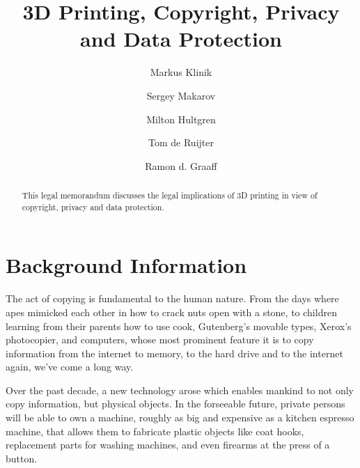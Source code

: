 \documentclass[a4paper]{article}
\begin{document}
\title{3D Printing, Copyright, Privacy and Data Protection}
\author{Markus Klinik
   \and Sergey Makarov
   \and Milton Hultgren
   \and Tom de Ruijter
   \and Ramon d. Graaff}
\maketitle

\begin{abstract}

This legal memorandum discusses the legal implications of 3D printing in view of
copyright, privacy and data protection.

\end{abstract}

\section{Background Information}

The act of copying is fundamental to the human nature.  From the days where apes
mimicked each other in how to crack nuts open with a stone, to children learning
from their parents how to use cook, Gutenberg's movable types, Xerox's
photocopier, and computers, whose most prominent feature it is to copy
information from the internet to memory, to the hard drive and to the internet
again, we've come a long way.

Over the past decade, a new technology arose which enables mankind to not only
copy information, but physical objects.  In the forseeable future, private
persons will be able to own a machine, roughly as big and expensive as a kitchen
espresso machine, that allows them to fabricate plastic objects like coat
hooks, replacement parts for washing machines, and even firearms at the press of
a button.
\end{document}
